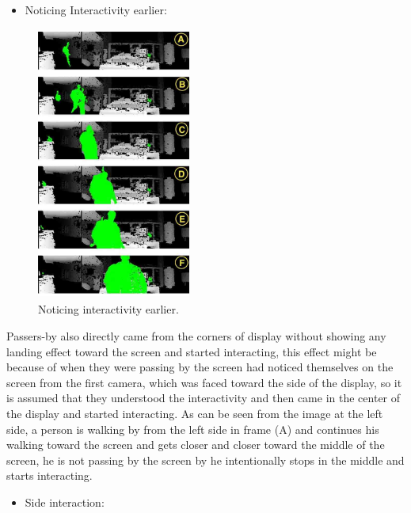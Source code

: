 \begin{itemize}
\item Noticing Interactivity earlier:
\end{itemize}


\begin{figure}
  \vspace{-30pt}
  \begin{center}
    \includegraphics[width=0.45\textwidth,height=90mm]{Figures/9/effects/noticing_earlier}
  \end{center}
  \vspace{-20pt}
  \caption{Noticing interactivity earlier.}
  \vspace{-60pt}
\end{figure}
Passers-by also directly came from the corners of display without showing any landing effect toward the screen and started interacting, this effect might be because of when they were passing by the screen had noticed themselves on the screen from the first camera, which was faced toward the side of the display, so it is assumed that they understood the interactivity and then came in the center of the display and started interacting. As can be seen from the image at the left side, a person is walking by from the left side in frame (A) and continues his walking toward the screen and gets closer and closer toward the middle of the screen, he is not passing by the screen by he intentionally stops in the middle and starts interacting. 
\break


\begin{itemize}

\item Side interaction:

\end{itemize}



